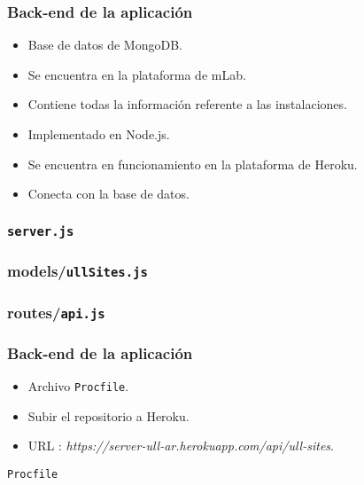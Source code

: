\begin{frame}
  \frametitle{Back-end de la aplicación}
    \begin{itemize}
    \item Base de datos de MongoDB.
		\item Se encuentra en la plataforma de mLab.
    \item Contiene todas la información referente a las instalaciones.
    \end{itemize}
  \endblock{}
  \begin{itemize}
  \item Implementado en Node.js.
  \item Se encuentra en funcionamiento en la plataforma de Heroku.
  \item Conecta con la base de datos.
  \end{itemize}
\endblock{}
\end{frame}

\begin{frame}
  \frametitle{\texttt{server.js}}
   
\end{frame}


\begin{frame}
  \frametitle{models/\texttt{ullSites.js}}
   
\end{frame}


\begin{frame}
  \frametitle{routes/\texttt{api.js}}
   
\end{frame}

\begin{frame}
  \frametitle{Back-end de la aplicación}
  \begin{itemize}
    \item Archivo \texttt{Procfile}.
    \item Subir el repositorio a Heroku.
    \item URL : \textit{https://server-ull-ar.herokuapp.com/api/ull-sites}.
    \end{itemize}
\endblock{}
  \texttt{Procfile}
  
\end{frame}